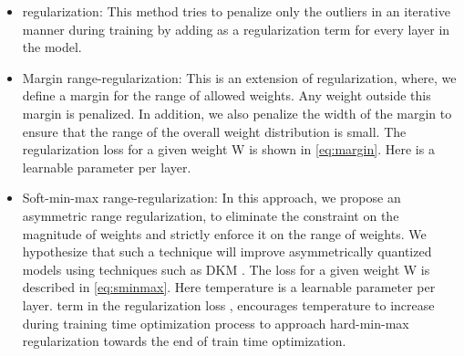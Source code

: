 \documentclass[10pt,twocolumn,letterpaper]{article}
\begin{document}
\begin{itemize}
    \item  regularization: This method tries to penalize only the outliers in an iterative manner during training by adding  as a regularization term for every layer in the model.
    
    \item Margin range-regularization: This is an extension of  regularization, where, we define a margin for the range of allowed weights. Any weight outside this margin is penalized. In addition, we also penalize the width of the margin to ensure that the range of the overall weight distribution is small. The regularization loss for a given weight W is shown in \cref{eq:margin}. Here  is a learnable parameter per layer.
    
    \item Soft-min-max range-regularization: In this approach, we propose an asymmetric range regularization, to eliminate the constraint on the magnitude of weights and strictly enforce it on the range of weights. We hypothesize that such a technique will improve asymmetrically quantized models using techniques such as DKM \cite{cho2021dkm}. The loss for a given weight W is described in \cref{eq:sminmax}. Here temperature  is a learnable parameter per layer.  term in the regularization loss , encourages temperature  to increase during training time optimization process to approach hard-min-max regularization towards the end of train time optimization.
    
\end{itemize}
\end{document}
